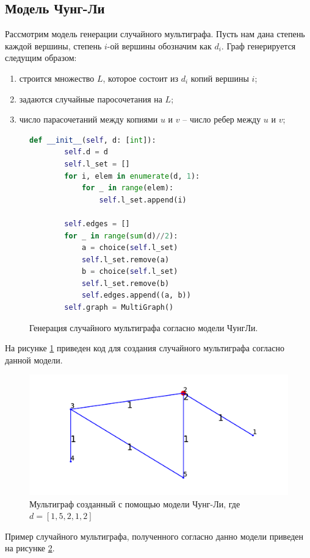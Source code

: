 \subsection{Модель Чунг-Ли}
Рассмотрим модель генерации случайного 
мультиграфа. Пусть нам дана степень каждой вершины,
степень $i$-ой вершины 
обозначим как  $d_{i}$. Граф генерируется следущим образом:
\begin{enumerate}
    \item строится множество $L$, которое состоит из
         $d_{i}$ копий вершины $i$;
    \item задаются случайные паросочетания на $L$;
    \item число парасочетаний между копиями  $u$ и  $v$ --
        число ребер между  $u$ и $v$;
\end{enumerate}
\begin{figure}[H] 
\begin{lstlisting}[language=Python] 
    def __init__(self, d: [int]):
        self.d = d
        self.l_set = []
        for i, elem in enumerate(d, 1):
            for _ in range(elem):
                self.l_set.append(i)

        self.edges = []
        for _ in range(sum(d)//2):
            a = choice(self.l_set)
            self.l_set.remove(a)
            b = choice(self.l_set)
            self.l_set.remove(b)
            self.edges.append((a, b))
        self.graph = MultiGraph()
\end{lstlisting}  
    \caption{Генерация случайного мультиграфа согласно модели ЧунгЛи.}
    \label{ch1}
\end{figure} 
На рисунке \ref{ch1} приведен код для создания случайного мультиграфа согласно данной модели.
\begin{figure}[H] 
    \includegraphics{ch.pdf}
    \caption{Мультиграф созданный с помощью модели Чунг-Ли,
    где $d = [1,5,2,1,2]$}
    \label{ch2}
\end{figure} 
Пример случайного мультиграфа, полученного согласно данно модели
приведен на рисунке \ref{ch2}.
